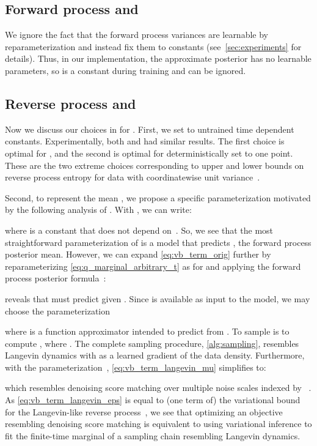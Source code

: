 \documentclass{article}
\begin{document}
\subsection[Forward process]{Forward process and }
We ignore the fact that the forward process variances  are learnable by reparameterization and instead fix them to constants (see~\cref{sec:experiments} for details).
Thus, in our implementation, the approximate posterior  has no learnable parameters, so  is a constant during training and can be ignored.


\subsection[Reverse process]{Reverse process and  } \label{sec:revproc_dsm_diffusion_connection}
Now we discuss our choices in  for .
First, we set  to untrained time dependent constants. Experimentally, both  and  had similar results. The first choice is optimal for , and the second is optimal for  deterministically set to one point. These are the two extreme choices corresponding to upper and lower bounds on reverse process entropy for data with coordinatewise unit variance~\citep{sohl2015deep}.


Second, to represent the mean , we propose a specific parameterization motivated by the following analysis of .
With , we can write:

where  is a constant that does not depend on~. So, we see that the most straightforward parameterization of  is a model that predicts , the forward process posterior mean.
However, we can expand \cref{eq:vb_term_orig} further by reparameterizing \cref{eq:q_marginal_arbitrary_t} as  for  and applying the forward process posterior formula~:



 reveals that  must predict  given . Since  is available as input to the model, we may choose the parameterization

where  is a function approximator intended to predict  from . To sample  is to compute
, where .
The complete sampling procedure, \cref{alg:sampling}, resembles Langevin dynamics with  as a learned gradient of the data density.
Furthermore, with the parameterization~, \cref{eq:vb_term_langevin_mu} simplifies to:

which resembles denoising score matching over multiple noise scales indexed by ~\citep{song2019generative}. As \cref{eq:vb_term_langevin_eps} is equal to (one term of) the variational bound for the Langevin-like reverse process~, we see that optimizing an objective resembling denoising score matching is equivalent to using variational inference to fit the finite-time marginal of a sampling chain resembling Langevin dynamics.
\end{document}
